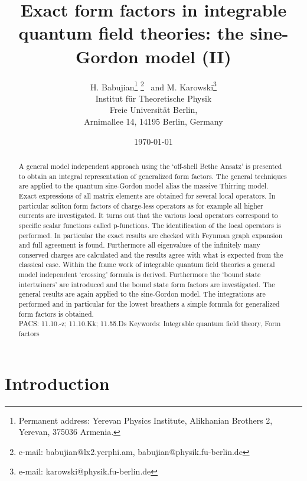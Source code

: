 \documentclass[a4paper,a4paper]{article}
\begin{document}
\title{Exact form factors in integrable quantum field theories: 
the sine-Gordon model (II) }
\author{H. Babujian\thanks{%
Permanent address: Yerevan Physics Institute, Alikhanian Brothers 2,
Yerevan, 375036 Armenia.} \thanks{
e-mail: babujian@lx2.yerphi.am, babujian@physik.fu-berlin.de}~ and M.
Karowski\thanks{
e-mail: karowski@physik.fu-berlin.de} \\
Institut f\"ur Theoretische Physik\\
Freie Universit\"at Berlin,\\
Arnimallee 14, 14195 Berlin, Germany\\
}
\date{\today}
\maketitle

\begin{abstract}
A general model independent approach using the `off-shell Bethe An\-satz' is
presented to obtain an integral representation of generalized form factors.
The general techniques are applied to the quantum sine-Gordon model alias
the massive Thirring model. Exact expressions of all matrix elements are
obtained for several local operators. In particular soliton form factors of
charge-less operators as for example all higher currents are investigated.
It turns out that the various local operators correspond to specific scalar
functions called p-functions. The identification of the local operators is
performed. In particular the exact results are checked with Feynman graph
expansion and full agreement is found. Furthermore all eigenvalues of the
infinitely many conserved charges are calculated and the results agree with
what is expected from the classical case. Within the frame work of
integrable quantum field theories a general model independent `crossing'
formula is derived. Furthermore the `bound state intertwiners' are
introduced and the bound state form factors are investigated. The general
results are again applied to the sine-Gordon model. The integrations are
performed and in particular for the lowest breathers a simple formula for
generalized form factors is obtained. \\[8pt]
PACS: 11.10.-z; 11.10.Kk; 11.55.Ds\newline
Keywords: Integrable quantum field theory, Form factors
\end{abstract}

\section{Introduction}
\end{document}
